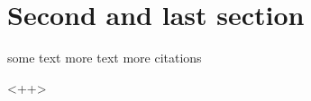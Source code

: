 \section{Second and last section}



some text \cite{zhu2009} more text more citations

\cite{}<++>
\putbib[ref2]
